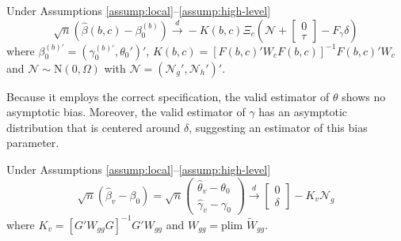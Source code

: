\begin{thm}
\label{thm:asymp}
Under Assumptions \ref{assump:local}--\ref{assump:high-level}
		\begin{equation}
		\sqrt{n}\left(\widehat{\beta}(b,c) - \beta_0^{(b)}\right) \overset{d}{\rightarrow} - K(b,c)\Xi_c \left(\mathscr{N}+ \left[ \begin{array}{c} 0\\ \tau\end{array}\right] - F_\gamma\delta\right)
	\end{equation}
where $\beta_0^{(b)'} = (\gamma_0^{(b)'}, \theta_0')'$, $K(b,c) = \left[F(b,c)'W_c F(b,c)\right]^{-1} F(b,c)' W_c$
and $\mathscr{N} \sim \mbox{N}(0, \Omega)$ with $\mathscr{N} = (\mathscr{N}_g', \mathscr{N}_h')'$.
\end{thm}	
Because it employs the correct specification, the valid estimator of $\theta$ shows no asymptotic bias.
Moreover, the valid estimator of $\gamma$ has an asymptotic distribution that is centered around $\delta$, suggesting an estimator of this bias parameter.
\begin{cor}
\label{cor:valid}
Under Assumptions \ref{assump:local}--\ref{assump:high-level}
		$$\sqrt{n}\left( \widehat{\beta}_v - \beta_0 \right) = \sqrt{n}\left(\begin{array}{c} \widehat{\theta}_v - \theta_0\\ \widehat{\gamma}_v - \gamma_0\end{array} \right) \overset{d}{\rightarrow}  \left[\begin{array}{c} 0\\ \delta\end{array}\right] -K_v \mathscr{N}_g$$
where $K_v = \left[G'W_{gg}G\right]^{-1}G'W_{gg}$ and $W_{gg} = \mbox{plim }\widetilde{W}_{gg}$.
\end{cor}

